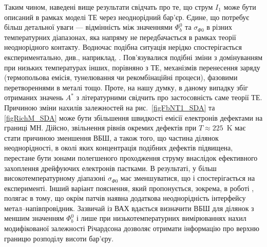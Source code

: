 Таким чином, наведені вище результати свідчать про те, що струм $I_1$ може бути описаний в рамках моделі ТЕ через неоднорідний бар'єр.
Єдине, що потребує більш детальної уваги --- відмінність між значеннями $\Phi_b^0$ та  $\sigma_{\Phi0}$ в різних температурних діапазонах,
яка напряму не передбачається в рамках теорії неоднорідного контакту.
Водночас подібна ситуація нерідко спостерігається експериментально, див., наприклад,
\cite{Tascioglu2010old,Yildirim2010,Mamor,Jiang:DGJap,JYOTHI2015,DURMUS2014,KHURE2015,OZAVCI2013,Tung:ApplPhysRev}.
Пов'язувалися подібні зміни  з домінуванням при низьких температурах інших, порівняно з ТЕ, механізмів перенесення заряду
(термопольова емісія, тунелювання чи рекомбінаційні процеси), фазовими перетвореннями в металі тощо.
Проте, на нашу думку, в даному випадку збіг  отриманих значень $A^*$ з літературними свідчить про застосовність саме теорії ТЕ.
Причиною зміни нахилів залежностей на рис.~\ref{figFbNT1_SDA} та \ref{figRichM_SDA} може бути збільшення швидкості емісії електронів дефектами на границі МН.
Дійсно, звільнення рівнів окремих дефектів при $T\approx225$~K має стати причиною зменшення ВБШ, а також того,
що частина ділянок неоднорідності, в околі яких концентрація подібних дефектів підвищена, перестане бути зонами полегшеного проходження струму внаслідок ефективного захоплення дрейфуючих електронів пастками.
В результаті, у більш високотемпературному діапазоні $\sigma_{\Phi0}$ має зменшуватися, що і спостерігається на експерименті.
Інший варіант пояснення, який пропонується, зокрема, в роботі \cite{Tung:ApplPhysRev},
полягає в тому, що окрім патчів наявна додаткова неоднорідність інтерфейсу метал--напівпровідник.
Зазвичай із ВАХ вдається визначити ВБШ для ділянок з меншим значенням $\Phi_b^0$ і лише при низькотемпературних вимірюваннях
нахил модифікованої залежності Річардсона дозволяє отримати інформацію про верхню границю розподілу висоти бар'єру.


